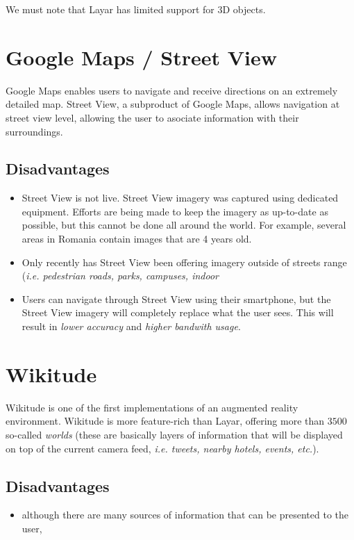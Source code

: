 \documentclass[a4paper,onecolumn,oneside,titlepage,12pt]{report}
\begin{document}
We must note that Layar has limited support for 3D objects.
\section{Google Maps / Street View}
Google Maps enables users to navigate and receive directions on an extremely detailed map. Street View, a subproduct of Google Maps, allows navigation at street view level, allowing the user to asociate information with their surroundings.
\subsection*{Disadvantages}
\begin{itemize}
	\item Street View is not live. Street View imagery was captured using dedicated equipment. Efforts are being made to keep the imagery as up-to-date as possible, but this cannot be done all around the world. For example, several areas in Romania contain images that are 4 years old.
	\item Only recently has Street View been offering imagery outside of streets range (\emph{i.e. pedestrian roads, parks, campuses, indoor}
	\item Users can navigate through Street View using their smartphone, but the Street View imagery will completely replace what the user sees. This will result in \emph{lower accuracy} and \emph{higher bandwith usage}.
\end{itemize}
\section{Wikitude}

Wikitude is one of the first implementations of an augmented reality environment. Wikitude is more feature-rich than Layar, offering more than $3500$ so-called \emph{worlds} (these are basically layers of information that will be displayed on top of the current camera feed, \emph{i.e. tweets, nearby hotels, events, etc.}).

\subsection*{Disadvantages}
\begin{itemize}
	\item although there are many sources of information that can be presented to the user, 
\end{itemize}
\end{document}
